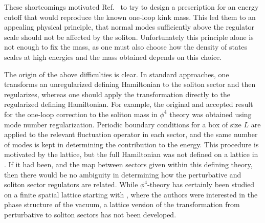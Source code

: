 \def\letter{0}\def\pr{0}\documentclass[a4paper,12pt, epsfig]{article}
\renewcommand{\(}{\begin{equation}}
\renewcommand{\)}{end{equation} \vspace{-.05in}\linebreak}
\renewcommand{\=}{\hspace{-.03in}=\hspace{-.02in}}
\renewcommand{\(}{\begin{equation}}
\renewcommand{\)}{\end{equation}}
\renewcommand{\(}{\begin{equation}}
\renewcommand{\)}{\end{equation}}
\begin{document}
These shortcomings motivated Ref.~\cite{lit} to try to design a prescription for an energy cutoff that would reproduce the known one-loop kink mass.  This led them to an appealing physical principle, that normal modes sufficiently above the regulator scale should not be affected by the soliton.  Unfortunately this principle alone is not enough to fix the mass, as one must also choose how the density of states scales at high energies and the mass obtained depends on this choice. 

The origin of the above difficulties is clear.  In standard approaches, one transforms an unregularized defining Hamiltonian to the soliton sector and then regularizes, whereas one should apply the transformation directly to the regularized defining Hamiltonian.  For example, the original and accepted result for the one-loop correction to the soliton mass in $\phi^4$ theory \cite{dhn2} was obtained using mode number regularization.  Periodic boundary conditions for a box of size $L$ are applied to the relevant fluctuation operator in each sector, and the same number of modes is kept in determining the contribution to the energy.  This procedure is motivated by the lattice, but the full Hamiltonian was not defined on a lattice in \cite{dhn2}.  If it had been, and the map between sectors given within this defining theory, then there would be no ambiguity in determining how the perturbative and soliton sector regulators are related.  While $\phi^4$-theory has certainly been studied on a finite spatial lattice starting with \cite{Drell:1976bq}, where the authors were interested in the phase structure of the vacuum, a lattice version of the transformation from perturbative to soliton sectors has not been developed.


\end{document}
